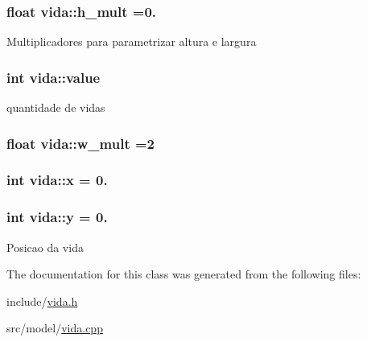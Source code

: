 \subsubsection[{\texorpdfstring{h\+\_\+mult}{h_mult}}]{\setlength{\rightskip}{0pt plus 5cm}float vida\+::h\+\_\+mult =0.\hspace{0.3cm}{\ttfamily [private]}}\hypertarget{classvida_a5751fa7104125853e5dd42a9d9cebf6b}{}\label{classvida_a5751fa7104125853e5dd42a9d9cebf6b}
Multiplicadores para parametrizar altura e largura 
\subsubsection[{\texorpdfstring{value}{value}}]{\setlength{\rightskip}{0pt plus 5cm}int vida\+::value\hspace{0.3cm}{\ttfamily [private]}}\hypertarget{classvida_ae9dec2f5055b4b7b7a67be0d3c344ba4}{}\label{classvida_ae9dec2f5055b4b7b7a67be0d3c344ba4}
quantidade de vidas 
\subsubsection[{\texorpdfstring{w\+\_\+mult}{w_mult}}]{\setlength{\rightskip}{0pt plus 5cm}float vida\+::w\+\_\+mult =2\hspace{0.3cm}{\ttfamily [private]}}\hypertarget{classvida_af4cfd2e27f1a6ec987e40624b7534c69}{}\label{classvida_af4cfd2e27f1a6ec987e40624b7534c69}
\subsubsection[{\texorpdfstring{x}{x}}]{\setlength{\rightskip}{0pt plus 5cm}int vida\+::x = 0.\hspace{0.3cm}{\ttfamily [private]}}\hypertarget{classvida_a17ff04538fab7157cac229771afaf8ef}{}\label{classvida_a17ff04538fab7157cac229771afaf8ef}
\subsubsection[{\texorpdfstring{y}{y}}]{\setlength{\rightskip}{0pt plus 5cm}int vida\+::y = 0.\hspace{0.3cm}{\ttfamily [private]}}\hypertarget{classvida_ac811d6096e5b4d9a5d4eb5aa935a242d}{}\label{classvida_ac811d6096e5b4d9a5d4eb5aa935a242d}
Posicao da vida 

The documentation for this class was generated from the following files\+:\begin{DoxyCompactItemize}
\item 
include/\hyperlink{vida_8h}{vida.\+h}\item 
src/model/\hyperlink{vida_8cpp}{vida.\+cpp}\end{DoxyCompactItemize}
